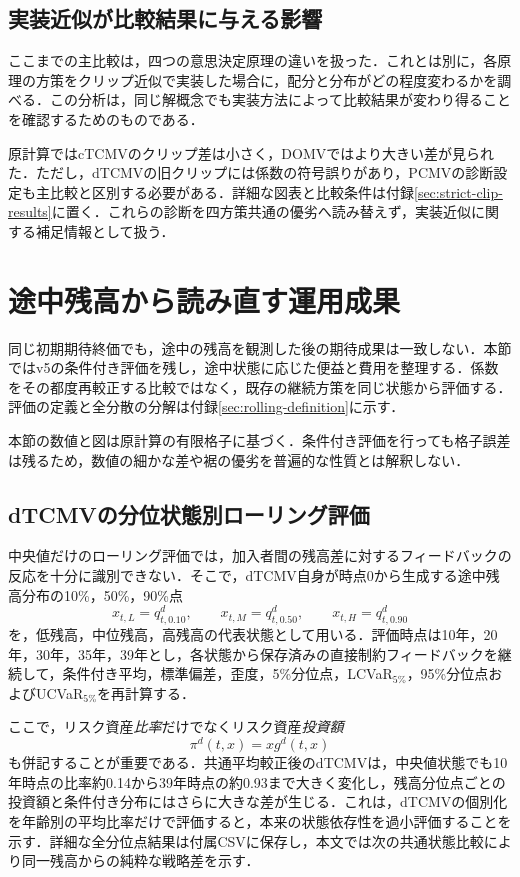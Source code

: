 \documentclass[10pt,a4paper]{article}
\theoremstyle{plain}
\theoremstyle{definition}
\begin{document}
\subsection{実装近似が比較結果に与える影響}
ここまでの主比較は，四つの意思決定原理の違いを扱った．これとは別に，各原理の方策をクリップ近似で実装した場合に，配分と分布がどの程度変わるかを調べる．この分析は，同じ解概念でも実装方法によって比較結果が変わり得ることを確認するためのものである．

原計算ではcTCMVのクリップ差は小さく，DOMVではより大きい差が見られた．ただし，dTCMVの旧クリップには係数の符号誤りがあり，PCMVの診断設定も主比較と区別する必要がある．詳細な図表と比較条件は付録\ref{sec:strict-clip-results}に置く．これらの診断を四方策共通の優劣へ読み替えず，実装近似に関する補足情報として扱う．

\section{途中残高から読み直す運用成果}\label{sec:rolling-main}
同じ初期期待終価でも，途中の残高を観測した後の期待成果は一致しない．本節ではv5の条件付き評価を残し，途中状態に応じた便益と費用を整理する．係数をその都度再較正する比較ではなく，既存の継続方策を同じ状態から評価する．評価の定義と全分散の分解は付録\ref{sec:rolling-definition}に示す．

本節の数値と図は原計算の有限格子に基づく．条件付き評価を行っても格子誤差は残るため，数値の細かな差や裾の優劣を普遍的な性質とは解釈しない．
\subsection{dTCMVの分位状態別ローリング評価}
\label{sec:dtcmv-rolling-quantiles}

中央値だけのローリング評価では，加入者間の残高差に対するフィードバックの反応を十分に識別できない．そこで，dTCMV自身が時点0から生成する途中残高分布の10\%，50\%，90\%点
\[
  x_{t,L}=q_{t,0.10}^{d},\qquad
  x_{t,M}=q_{t,0.50}^{d},\qquad
  x_{t,H}=q_{t,0.90}^{d}
\]
を，低残高，中位残高，高残高の代表状態として用いる．評価時点は10年，20年，30年，35年，39年とし，各状態から保存済みの直接制約フィードバックを継続して，条件付き平均，標準偏差，歪度，5\%分位点，LCVaR$_{5\%}$，95\%分位点およびUCVaR$_{5\%}$を再計算する．

ここで，リスク資産\emph{比率}だけでなくリスク資産\emph{投資額}
\[
  \pi^d(t,x)=x g^d(t,x)
\]
も併記することが重要である．共通平均較正後のdTCMVは，中央値状態でも10年時点の比率約0.14から39年時点の約0.93まで大きく変化し，残高分位点ごとの投資額と条件付き分布にはさらに大きな差が生じる．これは，dTCMVの個別化を年齢別の平均比率だけで評価すると，本来の状態依存性を過小評価することを示す．詳細な全分位点結果は付属CSVに保存し，本文では次の共通状態比較により同一残高からの純粋な戦略差を示す．
\end{document}

